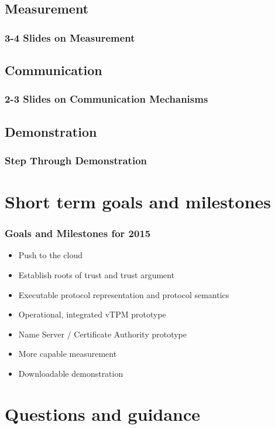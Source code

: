 \documentclass{beamer}
\begin{document}
\subsection{Measurement}

\begin{frame}
  \frametitle{3-4 Slides on Measurement}
\end{frame}

\subsection{Communication}

\begin{frame}
  \frametitle{2-3 Slides on Communication Mechanisms}
\end{frame}

\subsection{Demonstration}

\begin{frame}
  \frametitle{Step Through Demonstration}
\end{frame}

\section{Short term goals and milestones}

\begin{frame}
  \frametitle{Goals and Milestones for 2015}

  \begin{itemize}
  \item Push to the cloud
  \item Establish roots of trust and trust argument
  \item Executable protocol representation and protocol semantics
  \item Operational, integrated vTPM prototype
  \item Name Server / Certificate Authority prototype
  \item More capable measurement
  \item Downloadable demonstration
  \end{itemize}
\end{frame}

\section{Questions and guidance}
\end{document}
